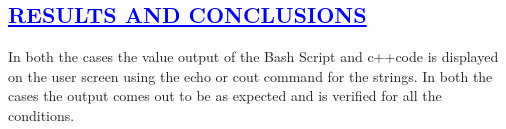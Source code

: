 \documentclass[a4paper,12pt]{report}
\begin{document}
\begin{center}
\chapter{\textcolor{blue}{\underline {RESULTS AND CONCLUSIONS}}}\end{center}

\noindent In both the cases the value output of the Bash Script  and c++code is displayed on the user screen using the echo or cout command for the strings. 
\noindent In both the cases the output comes out to  be as expected and is verified for all the conditions.
\end{document}

